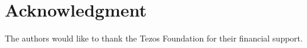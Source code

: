 \section*{Acknowledgment}
The authors would like to thank the Tezos Foundation for their financial support.
